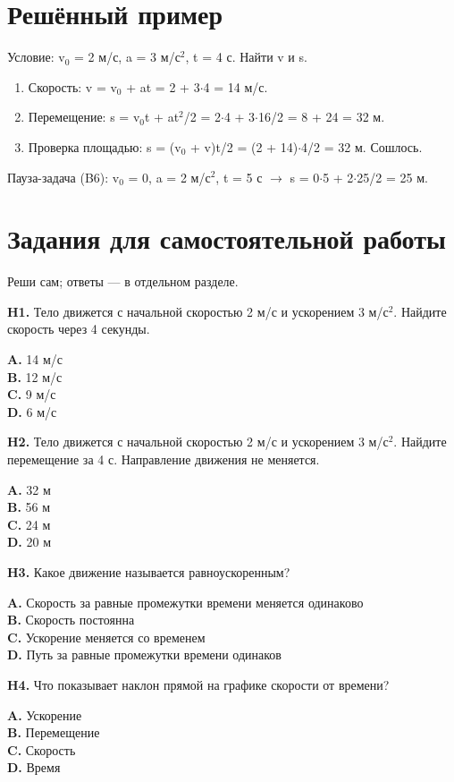 \documentclass[11pt]{article}
\begin{document}
\section*{Решённый пример}
Условие: v$_0$ = 2 м/с, a = 3 м/с$^2$, t = 4 с. Найти v и s.
\begin{enumerate}
\item Скорость: v = v$_0$ + at = 2 + 3$\cdot$4 = 14 м/с.
\item Перемещение: s = v$_0$t + at$^2$/2 = 2$\cdot$4 + 3$\cdot$16/2 = 8 + 24 = 32 м.
\item Проверка площадью: s = (v$_0$ + v)t/2 = (2 + 14)$\cdot$4/2 = 32 м. Сошлось.
\end{enumerate}
Пауза-задача (B6): v$_0$ = 0, a = 2 м/с$^2$, t = 5 с $\to$ s = 0$\cdot$5 + 2$\cdot$25/2 = 25 м.
\section*{Задания для самостоятельной работы}
Реши сам; ответы — в отдельном разделе.


\textbf{H1.} Тело движется с начальной скоростью 2 м/с и ускорением 3 м/с$^2$. Найдите скорость через 4 секунды.

\textbf{A.} 14 м/с \\
\textbf{B.} 12 м/с \\
\textbf{C.} 9 м/с \\
\textbf{D.} 6 м/с

\textbf{H2.} Тело движется с начальной скоростью 2 м/с и ускорением 3 м/с$^2$. Найдите перемещение за 4 с. Направление движения не меняется.

\textbf{A.} 32 м \\
\textbf{B.} 56 м \\
\textbf{C.} 24 м \\
\textbf{D.} 20 м

\textbf{H3.} Какое движение называется равноускоренным?

\textbf{A.} Скорость за равные промежутки времени меняется одинаково \\
\textbf{B.} Скорость постоянна \\
\textbf{C.} Ускорение меняется со временем \\
\textbf{D.} Путь за равные промежутки времени одинаков

\textbf{H4.} Что показывает наклон прямой на графике скорости от времени?

\textbf{A.} Ускорение \\
\textbf{B.} Перемещение \\
\textbf{C.} Скорость \\
\textbf{D.} Время
\end{document}
